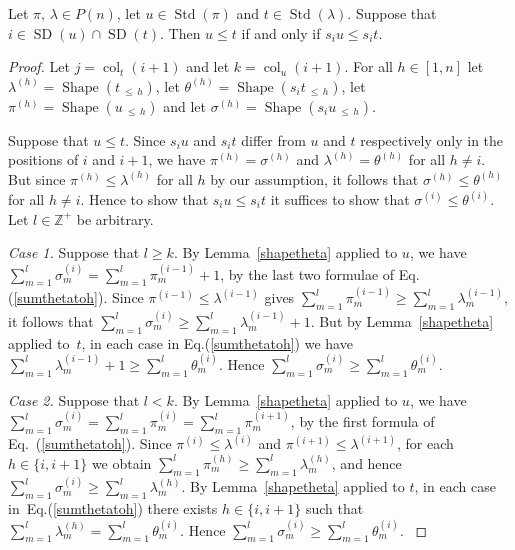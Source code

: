 \documentclass[ALCO,ThmDefs,Unicode,epreuves]{cedram}
\newenvironment{Case}[1]{\smallskip\noindent\emph{Case #1}\endgraf
 \nobreak\noindent\ignorespaces}{\endgraf\smallskip}
\DeclareMathOperator{\col}{col}
\newcommand{\Lessthan}[2]{#1\,{_{\leqslant\,#2}}}
\DeclareMathOperator{\STD}{Std}
\DeclareMathOperator{\shape}{Shape}
\DeclareMathOperator{\SD}{SD}
\begin{document}
\begin{lemm}\label{characterisationofdominanceorderontab}
Let $\pi,\,\lambda\in P(n)$, let $u\in\STD(\pi)$ and
$t\in\STD(\lambda)$. Suppose that $i\in\SD(u)\cap\SD(t)$. Then
$u \leqslant t$ if and only if $s_{i}u \leqslant s_{i}t$.
\end{lemm}

\begin{proof}
Let $j=\col_t(i+1)$ and let $k=\col_u(i+1)$.
For all $h\in[1,n]$ let $\lambda^{(h)} = \shape(\Lessthan th)$, let
$\theta^{(h)} = \shape(\Lessthan{s_{i}t}h)$,
let $\pi^{(h)} = \shape(\Lessthan uh)$ and let
 $\sigma^{(h)} = \shape(\Lessthan{s_{i}u}h)$.

Suppose that $u\leqslant t$. Since $s_iu$ and $s_it$ differ from
$u$ and $t$ respectively only in the positions of $i$ and $i+1$, we have
$\pi^{(h)}=\sigma^{(h)}$ and $\lambda^{(h)}=\theta^{(h)}$ for all $h\neq i$.
But since $\pi^{(h)}\leqslant\lambda^{(h)}$ for all $h$ by our assumption,
it follows that $\sigma^{(h)}\leqslant\theta^{(h)}$ for all $h\neq i$.
Hence to show that $s_iu\leqslant s_it$ it suffices to show that
$\sigma^{(i)}\leqslant\theta^{(i)}$.
Let $l\in\mathbb{Z}^+$ be arbitrary.

\begin{Case}{1.}
Suppose that $l\geqslant k$. By Lemma~\ref{shapetheta} applied to $u$,
we have $\sum_{m=1}^l \sigma^{(i)}_m = \sum_{m=1}^l \pi^{(i-1)}_m + 1$,
by the last two formulae of Eq.(\ref{sumthetatoh}).
Since $\pi^{(i-1)}\leqslant\lambda^{(i-1)}$ gives
$\sum_{m=1}^l \pi^{(i-1)}_m \geqslant \sum_{m=1}^l \lambda^{(i-1)}_m$,
it follows that
$\sum_{m=1}^l \sigma^{(i)}_m \geqslant \sum_{m=1}^l \lambda^{(i-1)}_m + 1$.
But by Lemma~\ref{shapetheta} applied to~$t$, in each case
in Eq.(\ref{sumthetatoh}) we have
$\sum_{m=1}^l \lambda^{(i-1)}_m + 1 \geqslant \sum_{m=1}^l \theta^{(i)}_m$.
Hence $\sum_{m=1}^l \sigma^{(i)}_m \geqslant \sum_{m=1}^l \theta^{(i)}_m$.
\end{Case}

\begin{Case}{2.}
Suppose that $l<k$. By Lemma~\ref{shapetheta} applied to $u$, we have
$\sum_{m=1}^l \sigma^{(i)}_m = \sum_{m=1}^l \pi^{(i)}_m
= \sum_{m=1}^l \pi^{(i+1)}_m\!$, by the first formula of Eq.~(\ref{sumthetatoh}).
Since $\pi^{(i)}\leqslant\lambda^{(i)}$
and $\pi^{(i+1)}\leqslant\lambda^{(i+1)}$, for each $h\in\{i,i+1\}$
we obtain
$\sum_{m=1}^l \pi^{(h)}_m \geqslant \sum_{m=1}^l \lambda^{(h)}_m$,
and hence $\sum_{m=1}^l \sigma^{(i)}_m\geqslant \sum_{m=1}^l \lambda^{(h)}_m$.
By Lemma~\ref{shapetheta} applied to $t$,
in each case in~Eq.(\ref{sumthetatoh}) there exists $h\in\{i,i+1\}$
such that $\sum_{m=1}^l \lambda^{(h)}_m = \sum_{m=1}^l \theta^{(i)}_m$.
Hence $\sum_{m=1}^l \sigma^{(i)}_m \geqslant \sum_{m=1}^l \theta^{(i)}_m$.
\end{Case}


\end{proof}
\end{document}
